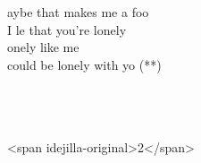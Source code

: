 \begin{cancion}[Broken][lovelytheband]
\begin{chorus}
	aybe that makes me a foo\\
	I le that you’re lonely\\
	onely like me\\
	 could be lonely with yo (**)\\
	\end{chorus}%
	\jump\\
{}\vspace*{-0.4cm}\\
{}\vspace*{-0.4cm}\\
	<span idejilla-original>2</span>\\
\end{cancion}%

